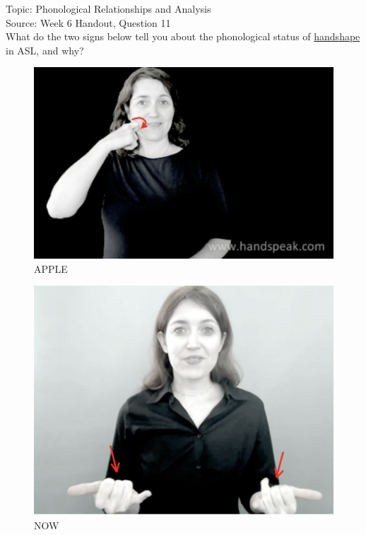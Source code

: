 \documentclass[12pt]{article}
\begin{document}
Topic: Phonological Relationships and Analysis\\
Source: Week 6 Handout, Question 11\\

What do the two signs below tell you about the phonological status of \underline{handshape} in ASL, and why?\\

\begin{figure}[H]
\includegraphics{../images/asl_apple.png}
\caption{APPLE}
\end{figure}
\begin{figure}[H]
\includegraphics{../images/asl_now.png}
\caption{NOW}
\end{figure}

\newpage

\begin{center}
\textbf{{\color{red}{\HUGE END OF EXAM}}}\\

\end{center}
\newpage
\end{document}
